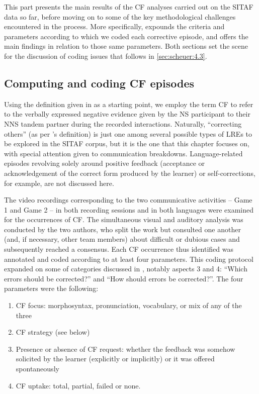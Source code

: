 \documentclass[output=paper,colorlinks,citecolor=brown,modfonts,nonflat]{../langscibook}
\begin{document}
This part presents the main results of the CF analyses carried out on the SITAF data so far, before moving on to some of the key methodological challenges encountered in the process. More specifically,  expounds the criteria and parameters according to which we coded each corrective episode, and  offers the main findings in relation to those same parameters. Both sections set the scene for the discussion of coding issues that follows in \ref{sec:scheuer:4.3}.

\subsection{Computing and coding CF episodes}\label{sec:scheuer:4.1}

Using the definition given in  as a starting point, we employ the term CF to refer to the verbally expressed negative evidence given by the NS participant to their NNS tandem partner during the recorded interactions. Naturally, “correcting others” (as per \citeauthor{SwainLapkin1998}'s \citeyear{SwainLapkin1998} definition) is just one among several possible types of LREs to be explored in the SITAF corpus, but it is the one that this chapter focuses on, with special attention given to communication breakdowns. Language-related episodes revolving solely around positive feedback (acceptance or acknowledgement of the correct form produced by the learner) or self-corrections, for example, are not discussed here.

The video recordings corresponding to the two communicative activities – Game 1 and Game 2 – in both recording sessions and in both languages were examined for the occurrences of CF. The simultaneous visual and auditory analysis was conducted by the two authors, who split the work but consulted one another (and, if necessary, other team members) about difficult or dubious cases and subsequently reached a consensus. Each CF occurrence thus identified was annotated and coded according to at least four parameters. This coding protocol expanded on some of  categories discussed in , notably aspects 3 and 4: “Which errors should be corrected?” and “How should errors be corrected?”. The four parameters were the following:

\begin{enumerate}
\item CF focus: morphosyntax, pronunciation, vocabulary, or mix of any of the three
\item CF strategy (see below)
\item Presence or absence of CF request: whether the feedback was somehow solicited by the learner (explicitly or implicitly) or it was offered spontaneously
\item CF uptake: total, partial, failed or none.
\end{enumerate}
\end{document}
